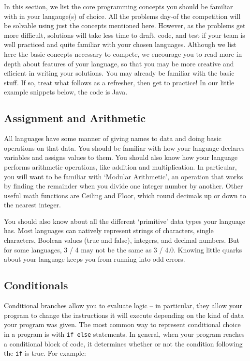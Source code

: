 \documentclass[a4paper]{article}
\begin{document}
In this section, we list the core programming concepts you should be familiar with in your langauge(s) of choice. All the problems day-of the competition will be solvable using just the concepts mentioned here. However, as the problems get more difficult, solutions will take less time to draft, code, and test if your team is well practiced and quite familiar with your chosen languages. Although we list here the basic concepts necessary to compete, we encourage you to read more in depth about features of your language, so that you may be more creative and efficient in writing your solutions. You may already be familiar with the basic stuff. If so, treat what follows as a refresher, then get to practice! In our little example snippets below, the code is Java.

\subsection{Assignment and Arithmetic}
All languages have some manner of giving names to data and doing basic operations on that data. You should be familiar with how your language declares variables and assigns values to them. You should also know how your language performs arithmetic operations, like addition and multiplication. In particular, you will want to be familiar with `Modular Arithmetic', an operation that works by finding the remainder when you divide one integer number by another. Other useful math functions are Ceiling and Floor, which round decimals up or down to the nearest integer.

You should also know about all the different `primitive' data types your language has. Most languages can natively represent strings of characters, single characters, Boolean values (true and false), integers, and decimal numbers. But for some languages, 3 / 4 may not be the same as 3 / 4.0. Knowing little quarks about your language keeps you from running into odd errors.

\subsection{Conditionals}
Conditional branches allow you to evaluate logic -- in particular, they allow your program to change the instructions it will execute depending on the kind of data your program was given. The most common way to represent conditional choice in a program is with \texttt{if else} statements. In general, when your program reaches a conditional block of code, it determines whether or not the condition following the \texttt{if} is true. For example:
\end{document}
